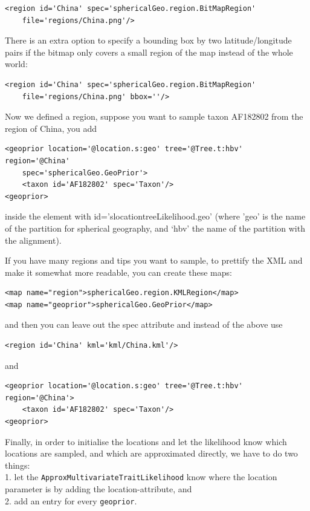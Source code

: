 \documentclass{article}
\begin{document}
\begin{verbatim}
<region id='China' spec='sphericalGeo.region.BitMapRegion'
	file='regions/China.png'/>
\end{verbatim}
There is an extra option to specify a bounding box by two latitude/longitude pairs if the bitmap only covers a small region of the map instead of the whole world:
\begin{verbatim}
<region id='China' spec='sphericalGeo.region.BitMapRegion'
	file='regions/China.png' bbox=''/>
\end{verbatim}



Now we defined a region, suppose you want to sample taxon AF182802 from the region of China, you add

\begin{verbatim}
<geoprior location='@location.s:geo' tree='@Tree.t:hbv' region='@China'
	spec='sphericalGeo.GeoPrior'>
	<taxon id='AF182802' spec='Taxon'/> 
<geoprior>
\end{verbatim}

inside the element with id='slocationtreeLikelihood.geo' (where 'geo' is the name of the partition for spherical geography, and `hbv' the name of the partition with the alignment).


If you have many regions and tips you want to sample, to prettify the XML and make it somewhat more readable, you can create these maps:

\begin{verbatim}
<map name="region">sphericalGeo.region.KMLRegion</map>
<map name="geoprior">sphericalGeo.GeoPrior</map>
\end{verbatim}

and then you can leave out the spec attribute and instead of the above use

\begin{verbatim}
<region id='China' kml='kml/China.kml'/>
\end{verbatim}

and 

\begin{verbatim}
<geoprior location='@location.s:geo' tree='@Tree.t:hbv' region='@China'>
	<taxon id='AF182802' spec='Taxon'/>
<geoprior>
\end{verbatim}



Finally, in order to initialise the locations and let the likelihood know which locations are sampled, and which are approximated directly, we have to do two things:\\
1. let the {\tt ApproxMultivariateTraitLikelihood} know where the location parameter is by adding the location-attribute, and\\
2. add an entry for every {\tt geoprior}.
\end{document}
